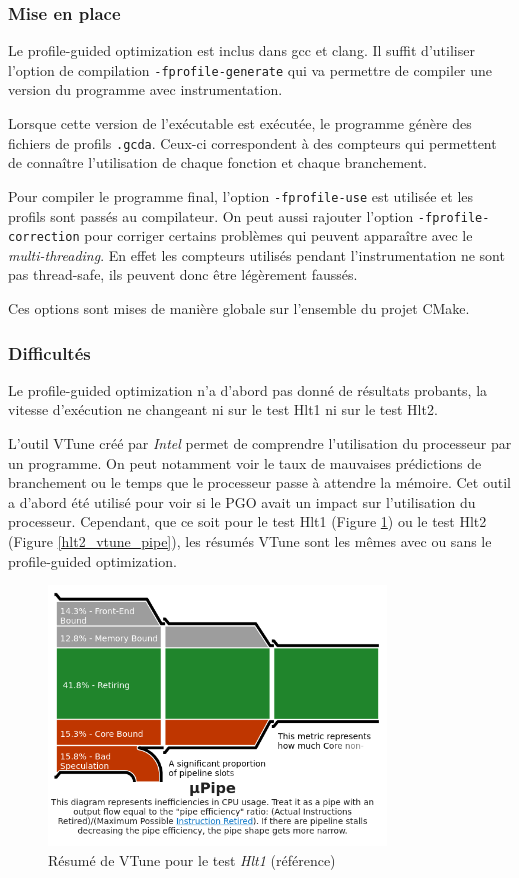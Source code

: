 \documentclass[a4paper,11pt]{report}
\begin{document}
\subsubsection{Mise en place}
Le profile-guided optimization est inclus dans gcc et clang.
Il suffit d'utiliser l'option de compilation \verb'-fprofile-generate' qui va permettre de compiler une version du programme avec instrumentation.

Lorsque cette version de l'exécutable est exécutée, le programme génère des fichiers de profils \verb'.gcda'.
Ceux-ci correspondent à des compteurs qui permettent de connaître l'utilisation de chaque fonction et chaque branchement.

Pour compiler le programme final, l'option \verb'-fprofile-use' est utilisée et les profils sont passés au compilateur.
On peut aussi rajouter l'option \verb'-fprofile-correction' pour corriger certains problèmes qui peuvent apparaître avec le \emph{multi-threading}.
En effet les compteurs utilisés pendant l'instrumentation ne sont pas thread-safe, ils peuvent donc être légèrement faussés.

Ces options sont mises de manière globale sur l'ensemble du projet CMake.

\subsubsection{Difficultés}
Le profile-guided optimization n'a d'abord pas donné de résultats probants, la vitesse d'exécution ne changeant ni sur le test Hlt1 ni sur le test Hlt2.

L'outil VTune créé par \emph{Intel} permet de comprendre l'utilisation du processeur par un programme.
On peut notamment voir le taux de mauvaises prédictions de branchement ou le temps que le processeur passe à attendre la mémoire.
Cet outil a d'abord été utilisé pour voir si le PGO avait un impact sur l'utilisation du processeur.
Cependant, que ce soit pour le test Hlt1 (Figure \ref{hlt1_vtune_pipe}) ou le test Hlt2 (Figure \ref{hlt2_vtune_pipe}), les résumés VTune sont les mêmes avec ou sans le profile-guided optimization.

\begin{figure}[H]
    \includegraphics[width=0.8\textwidth, center]{hlt1_vtune_pipe.png}
    \caption{Résumé de VTune pour le test \emph{Hlt1} (référence)}
    \label{hlt1_vtune_pipe}
\end{figure}
\end{document}
